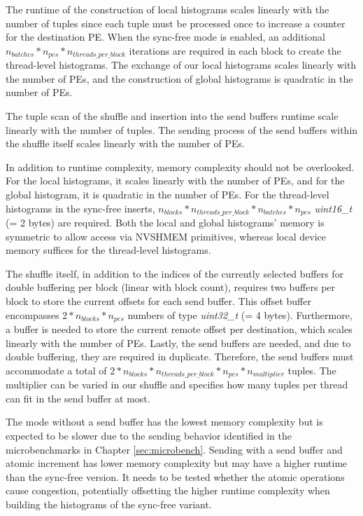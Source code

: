 The runtime of the construction of local histograms scales linearly with the number of tuples since each tuple must be processed once to increase a counter for the destination PE. When the sync-free mode is enabled, an additional $ n_{batches} * n_{pes} * n_{threads\_per\_block} $ iterations are required in each block to create the thread-level histograms. The exchange of our local histograms scales linearly with the number of PEs, and the construction of global histograms is quadratic in the number of PEs.

The tuple scan of the shuffle and insertion into the send buffers runtime scale linearly with the number of tuples. The sending process of the send buffers within the shuffle itself scales linearly with the number of PEs.

In addition to runtime complexity, memory complexity should not be overlooked. For the local histograms, it scales linearly with the number of PEs, and for the global histogram, it is quadratic in the number of PEs. For the thread-level histograms in the sync-free inserts, $ n_{blocks} * n_{threads\_per\_block} * n_{batches} * n_{pes} $ \textit{uint16\_t} (= 2 bytes) are required. Both the local and global histograms' memory is symmetric to allow access via NVSHMEM primitives, whereas local device memory suffices for the thread-level histograms.

The shuffle itself, in addition to the indices of the currently selected buffers for double buffering per block (linear with block count), requires two buffers per block to store the current offsets for each send buffer. This offset buffer encompasses $ 2 * n_{blocks} * n_{pes} $ numbers of type \textit{uint32\_t} (= 4 bytes). Furthermore, a buffer is needed to store the current remote offset per destination, which scales linearly with the number of PEs. Lastly, the send buffers are needed, and due to double buffering, they are required in duplicate. Therefore, the send buffers must accommodate a total of $ 2 * n_{blocks} * n_{threads\_per\_block} * n_{pes} * n_{multiplier} $ tuples. The multiplier can be varied in our shuffle and specifies how many tuples per thread can fit in the send buffer at most.

The mode without a send buffer has the lowest memory complexity but is expected to be slower due to the sending behavior identified in the microbenchmarks in Chapter \ref{sec:microbench}. Sending with a send buffer and atomic increment has lower memory complexity but may have a higher runtime than the sync-free version. It needs to be tested whether the atomic operations cause congestion, potentially offsetting the higher runtime complexity when building the histograms of the sync-free variant.

